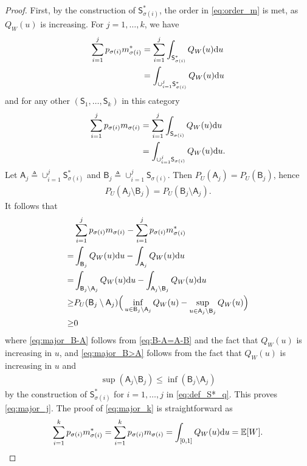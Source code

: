 \documentclass[conference]{IEEEtran}
\newcommand{\E}{\mathbb{E}}
\def\sA{{\mathsf A}}
\def\sS{{\mathsf S}}
\def\rd{{\rm d}}
\def\deq{\triangleq}
\begin{document}
\begin{proof}
First, by the construction of $\sS^*_{\sigma(i)}$, the order in \eqref{eq:order_m} is met, as $Q_W(u)$ is increasing.
For $j=1,\ldots,k$, we have
\begin{align}
\sum_{i=1}^j p_{\sigma(i)} m^*_{\sigma(i)}
&= \sum_{i=1}^j \int_{\sS^*_{\sigma(i)}} Q_W(u) \rd u \\
&= \int_{\cup_{i=1}^j \sS^*_{\sigma(i)}} Q_W(u) \rd u
\end{align}
and for any other $(\sS_1,\ldots,\sS_k)$ in this category
\begin{align}
\sum_{i=1}^j p_{\sigma(i)} m_{\sigma(i)}
&= \sum_{i=1}^j \int_{\sS_{\sigma(i)}} Q_W(u) \rd u \\
&= \int_{\cup_{i=1}^j \sS_{\sigma(i)}} Q_W(u) \rd u .
\end{align}
Let $\sA_j \deq \cup_{i=1}^j \sS^*_{\sigma(i)}$ and ${\mathsf B}_j \deq \cup_{i=1}^j \sS_{\sigma(i)}$. Then $P_U(\sA_j) = P_U(\mathsf B_j)$, hence
\begin{align}
    P_U(\sA_j\setminus\mathsf B_j) = P_U(\mathsf B_j \setminus \sA_j) . \label{eq:B-A=A-B}
\end{align}
It follows that
\begin{align}
& \sum_{i=1}^j p_{\sigma(i)} m_{\sigma(i)} 
-
\sum_{i=1}^j p_{\sigma(i)} m^*_{\sigma(i)} \nonumber \\
=& 
\int_{\mathsf B_j} Q_W(u) \rd u 
-
\int_{\sA_j} Q_W(u) \rd u \\
=& \int_{\mathsf B_j\setminus\sA_j} Q_W(u) \rd u 
-
\int_{\sA_j\setminus\mathsf B_j} Q_W(u) \rd u \\
\ge& P_U(\mathsf B_j \setminus \sA_j) \Big( \inf_{u\in \mathsf B_j \setminus \sA_j} Q_W(u) - \sup_{u\in \mathsf A_j \setminus \mathsf B_j} Q_W(u)\Big) \label{eq:major_B-A} \\
\ge & 0  \label{eq:major_B>A}
\end{align}
where \eqref{eq:major_B-A} follows from \eqref{eq:B-A=A-B} and the fact that $Q_W(u)$ is increasing in $u$, and \eqref{eq:major_B>A} follows from the fact that $Q_W(u)$ is increasing in $u$ and 
\begin{align}
    \sup( \sA_j\setminus\mathsf B_j )
\le 
    \inf( \mathsf B_j\setminus\sA_j )
\end{align}
by the construction of $\sS^*_{\sigma(i)}$ for $i=1,\ldots,j$ in \eqref{eq:def_S*_q}.
This proves \eqref{eq:major_j}.
The proof of \eqref{eq:major_k} is straightforward as
\begin{align}
    \sum_{i=1}^k p_{\sigma(i)} m^*_{\sigma(i)}
    =
    \sum_{i=1}^k p_{\sigma(i)} m_{\sigma(i)} 
    = \int_{[0,1]} Q_W(u) \rd u  = \E[W]. \nonumber
\end{align}
\end{proof}
\end{document}
